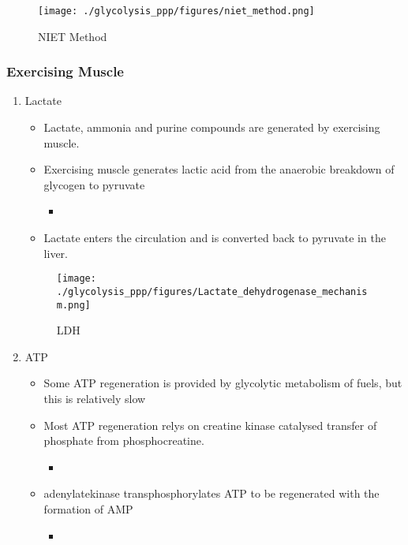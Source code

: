 \documentclass{scrartcl}
\begin{document}
\begin{figure}[htbp]
\centering
\texttt{[image: ./glycolysis\_ppp/figures/niet\_method.png]}
\caption{\label{fig:org4498385}
NIET Method}
\end{figure}

\subsubsection{Exercising Muscle}
\label{sec:orga9b05ad}
\begin{enumerate}
\item Lactate
\label{sec:org0da0967}
\begin{itemize}
\item Lactate, ammonia and purine compounds are generated by exercising muscle.
\item Exercising muscle generates lactic acid from the anaerobic breakdown
of glycogen to pyruvate
\begin{itemize}
\item {}
\end{itemize}
\item Lactate enters the circulation and is converted back to pyruvate in the liver.
\end{itemize}

\begin{figure}[htbp]
\centering
\texttt{[image: ./glycolysis\_ppp/figures/Lactate\_dehydrogenase\_mechanism.png]}
\caption{\label{fig:org3ece584}
LDH}
\end{figure}

\item ATP
\label{sec:orgff3dba6}

\begin{itemize}
\item Some ATP regeneration is provided by glycolytic metabolism of fuels,
but this is relatively slow
\item Most ATP regeneration relys on creatine kinase catalysed transfer of
phosphate from phosphocreatine.

\begin{itemize}
\item {}
\end{itemize}

\item adenylatekinase transphosphorylates ATP to be regenerated with the formation
of AMP

\begin{itemize}
\item {}
\end{itemize}


\end{itemize}
\end{enumerate}
\end{document}
